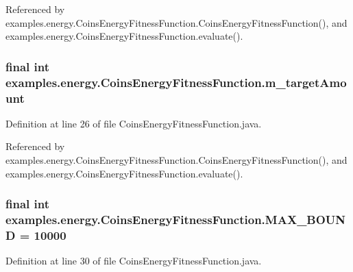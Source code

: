 Referenced by examples.\-energy.\-Coins\-Energy\-Fitness\-Function.\-Coins\-Energy\-Fitness\-Function(), and examples.\-energy.\-Coins\-Energy\-Fitness\-Function.\-evaluate().

\hypertarget{classexamples_1_1energy_1_1_coins_energy_fitness_function_afb63b58598f3772fa2f97c979879b281}{
\subsubsection[{m\-\_\-target\-Amount}]{\setlength{\rightskip}{0pt plus 5cm}final int examples.\-energy.\-Coins\-Energy\-Fitness\-Function.\-m\-\_\-target\-Amount\hspace{0.3cm}{\ttfamily [private]}}}\label{classexamples_1_1energy_1_1_coins_energy_fitness_function_afb63b58598f3772fa2f97c979879b281}


Definition at line 26 of file Coins\-Energy\-Fitness\-Function.\-java.



Referenced by examples.\-energy.\-Coins\-Energy\-Fitness\-Function.\-Coins\-Energy\-Fitness\-Function(), and examples.\-energy.\-Coins\-Energy\-Fitness\-Function.\-evaluate().

\hypertarget{classexamples_1_1energy_1_1_coins_energy_fitness_function_ac02e8fa7435c47582e6afcd04dd49d89}{
\subsubsection[{M\-A\-X\-\_\-\-B\-O\-U\-N\-D}]{\setlength{\rightskip}{0pt plus 5cm}final int examples.\-energy.\-Coins\-Energy\-Fitness\-Function.\-M\-A\-X\-\_\-\-B\-O\-U\-N\-D = 10000\hspace{0.3cm}{\ttfamily [static]}}}\label{classexamples_1_1energy_1_1_coins_energy_fitness_function_ac02e8fa7435c47582e6afcd04dd49d89}


Definition at line 30 of file Coins\-Energy\-Fitness\-Function.\-java.



